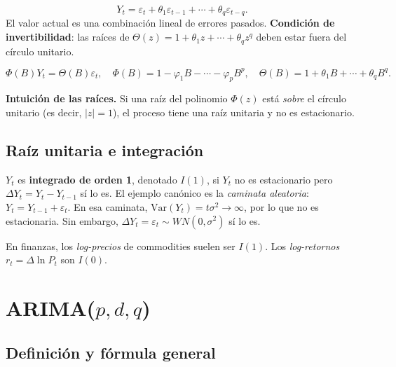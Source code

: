 \documentclass[12pt,a4paper]{article}
\theoremstyle{definition}
\begin{document}
\begin{defbox}
\[
  Y_t = \varepsilon_t + \theta_1 \varepsilon_{t-1} + \cdots + \theta_q \varepsilon_{t-q}.
\]
El valor actual es una combinación lineal de errores pasados.
\textbf{Condición de invertibilidad}: las raíces de
$\Theta(z) = 1 + \theta_1 z + \cdots + \theta_q z^q$ deben estar fuera del
círculo unitario.
\end{defbox}

\begin{defbox}[ARMA($p,q$)]
\[
  \Phi(B) Y_t = \Theta(B) \varepsilon_t, \quad
  \Phi(B) = 1 - \varphi_1 B - \cdots - \varphi_p B^p, \quad
  \Theta(B) = 1 + \theta_1 B + \cdots + \theta_q B^q.
\]
\end{defbox}

\noindent\textbf{Intuición de las raíces.} Si una raíz del polinomio $\Phi(z)$
está \emph{sobre} el círculo unitario (es decir, $|z|=1$), el proceso tiene
una raíz unitaria y no es estacionario.

\subsection{Raíz unitaria e integración}

\begin{defbox}[Proceso I(1)]
$Y_t$ es \textbf{integrado de orden 1}, denotado $I(1)$, si $Y_t$ no es
estacionario pero $\Delta Y_t = Y_t - Y_{t-1}$ sí lo es.
El ejemplo canónico es la \emph{caminata aleatoria}: $Y_t = Y_{t-1} + \varepsilon_t$.
En esa caminata, $\mathrm{Var}(Y_t) = t\sigma^2 \to \infty$, por lo que no es
estacionaria. Sin embargo, $\Delta Y_t = \varepsilon_t \sim WN(0,\sigma^2)$ sí
lo es.
\end{defbox}

\noindent En finanzas, los \emph{log-precios} de commodities suelen ser $I(1)$.
Los \emph{log-retornos} $r_t = \Delta \ln P_t$ son $I(0)$.

\section{ARIMA($p,d,q$)}

\subsection{Definición y fórmula general}
\end{document}
